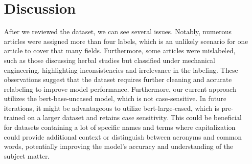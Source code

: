\documentclass[../main.tex]{subfiles}
\begin{document}
\chapter{Discussion}
After we reviewed the dataset, we can see several issues. 
Notably, numerous articles were assigned more than four labels, 
which is an unlikely scenario for one article to cover that many fields. 
Furthermore, some articles were mislabeled, 
such as those discussing herbal studies but classified under mechanical engineering, 
highlighting inconsistencies and irrelevance in the labeling. 
These observations suggest that the dataset requires further cleaning and accurate relabeling to improve model performance. 
Furthermore, our current approach utilizes the bert-base-uncased model, which is not case-sensitive. 
In future iterations, it might be advantageous to utilize bert-large-cased, 
which is pre-trained on a larger dataset and retains case sensitivity. 
This could be beneficial for datasets containing a lot  of specific names and terms 
where capitalization could provide additional context or distinguish between acronyms and common words, 
potentially improving the model's accuracy and understanding of the subject matter.
\end{document}
